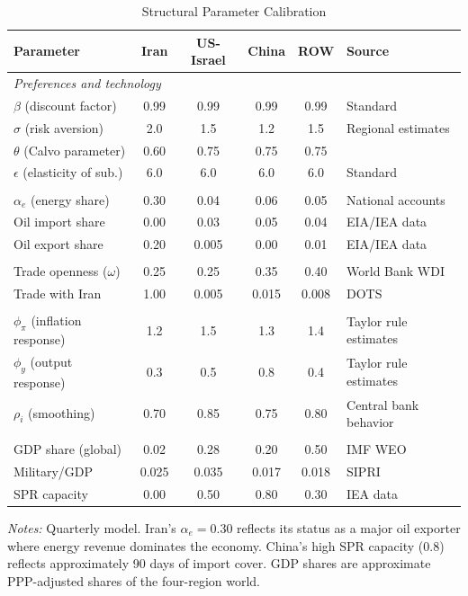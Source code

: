 \documentclass[12pt,a4paper]{article}
\begin{document}
\begin{table}[H]
\centering
\small
\begin{threeparttable}
\caption{Structural Parameter Calibration}
\label{tab:calibration}
\begin{tabular}{@{}lccccl@{}}
\toprule
Parameter & Iran & US-Israel & China & ROW & Source \\
\midrule
\multicolumn{6}{l}{\textit{Preferences and technology}} \\
$\beta$ (discount factor) & 0.99 & 0.99 & 0.99 & 0.99 & Standard \\
$\sigma$ (risk aversion) & 2.0 & 1.5 & 1.2 & 1.5 & Regional estimates \\
$\theta$ (Calvo parameter) & 0.60 & 0.75 & 0.75 & 0.75 & \citet{gali2015monetary} \\
$\epsilon$ (elasticity of sub.) & 6.0 & 6.0 & 6.0 & 6.0 & Standard \\
\addlinespace
\multicolumn{6}{l}{\textit{Energy sector}} \\
$\alpha_e$ (energy share) & 0.30 & 0.04 & 0.06 & 0.05 & National accounts \\
Oil import share & 0.00 & 0.03 & 0.05 & 0.04 & EIA/IEA data \\
Oil export share & 0.20 & 0.005 & 0.00 & 0.01 & EIA/IEA data \\
\addlinespace
\multicolumn{6}{l}{\textit{Trade}} \\
Trade openness ($\omega$) & 0.25 & 0.25 & 0.35 & 0.40 & World Bank WDI \\
Trade with Iran & 1.00 & 0.005 & 0.015 & 0.008 & DOTS \\
\addlinespace
\multicolumn{6}{l}{\textit{Monetary policy}} \\
$\phi_\pi$ (inflation response) & 1.2 & 1.5 & 1.3 & 1.4 & Taylor rule estimates \\
$\phi_y$ (output response) & 0.3 & 0.5 & 0.8 & 0.4 & Taylor rule estimates \\
$\rho_i$ (smoothing) & 0.70 & 0.85 & 0.75 & 0.80 & Central bank behavior \\
\addlinespace
\multicolumn{6}{l}{\textit{Scale and military}} \\
GDP share (global) & 0.02 & 0.28 & 0.20 & 0.50 & IMF WEO \\
Military/GDP & 0.025 & 0.035 & 0.017 & 0.018 & SIPRI \\
SPR capacity & 0.00 & 0.50 & 0.80 & 0.30 & IEA data \\
\bottomrule
\end{tabular}
\begin{tablenotes}[flushleft]
\small
\item \textit{Notes:} Quarterly model. Iran's $\alpha_e = 0.30$ reflects its status as a major oil exporter where energy revenue dominates the economy. China's high SPR capacity (0.8) reflects approximately 90 days of import cover. GDP shares are approximate PPP-adjusted shares of the four-region world.
\end{tablenotes}
\end{threeparttable}
\end{table}
\end{document}
